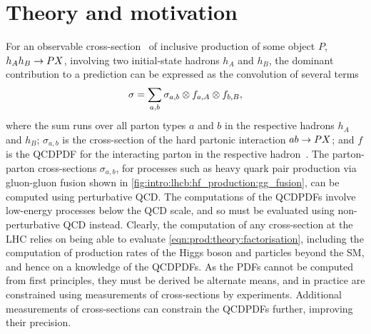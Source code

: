 \chapter{Theory and motivation}
\label{chap:prod:theory}

For an observable cross-section \xsec\ of inclusive production of some object 
$P$, $h_{A}h_{B} \to PX$, involving two initial-state hadrons $h_{A}$ and 
$h_{B}$, the dominant contribution to a prediction can be expressed as the 
convolution of several terms
\begin{equation}
  \sigma = \sum_{a,b} \sigma_{a,b} \otimes f_{a,A} \otimes f_{b,B},
  \label{eqn:prod:theory:factorisation}
\end{equation}
where the sum runs over all parton types $a$ and $b$ in the respective hadrons 
$h_{A}$ and $h_{B}$; $\sigma_{a,b}$ is the cross-section of the hard partonic 
interaction $ab \to PX$; and $f$ is the \ac{QCDPDF} for the interacting 
parton in the respective hadron~\cite{Collins:1989gx,Forte:2013wc}.
The parton-parton cross-sections $\sigma_{a,b}$, for processes such as heavy 
quark pair production via gluon-gluon fusion shown in 
\cref{fig:intro:lhcb:hf_production:gg_fusion}, can be computed using 
perturbative \ac{QCD}.
The computations of the \acp{QCDPDF} involve low-energy processes below the 
\ac{QCD} scale, and so must be evaluated using non-perturbative \ac{QCD} 
instead.
Clearly, the computation of any cross-section at the \ac{LHC} relies on being 
able to evaluate \cref{eqn:prod:theory:factorisation}, including the 
computation of production rates of the Higgs boson and particles beyond the 
\ac{SM}, and hence on a knowledge of the \acp{QCDPDF}.
As the \acp{PDF} cannot be computed from first principles, they must be derived 
be alternate means, and in practice are constrained using measurements of 
cross-sections by experiments.
Additional measurements of cross-sections can constrain the \acp{QCDPDF} 
further, improving their precision.

